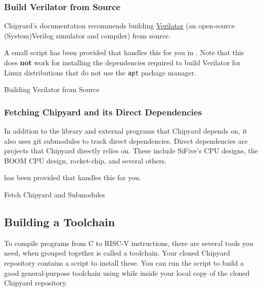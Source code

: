 \subsubsection{Build Verilator from Source}\label{sec:Build_Verilator_from_Source}
Chipyard's documentation recommends building \href{https://www.veripool.org/wiki/verilator}{Verilator} (an open-source (System)Verilog simulator and compiler) from source.

A small script has been provided that handles this for you in .
Note that this does \textbf{not} work for installing the dependencies required to build Verilator for Linux distributions that do not use the \texttt{apt} package manager.

\begin{listing}[h!tbp]
\caption{Building Verilator from Source}
\label{lst:Build_Verilator_from_Source}
\end{listing}

\subsubsection{Fetching Chipyard and its Direct Dependencies}\label{sec:Fetching_Chipyard_Direct_Dependencies}
In addition to the library and external programs that Chipyard depends on, it also uses git submodules to track direct dependencies.
Direct dependencies are projects that Chipyard directly relies on.
These include SiFive's CPU designs, the BOOM CPU design, rocket-chip, and several others.

 has been provided that handles this for you.

\begin{listing}[h!tbp]
\caption{Fetch Chipyard and Submodules}
\label{lst:Fetch_Chipyard_and_Submodules}
\end{listing}

\subsection{Building a Toolchain}\label{sec:Building_Toolchain}
To compile programs from C to RISC-V instructions, there are several tools you need, when grouped together is called a toolchain.
Your cloned Chipyard repository contains a script to install these.
You can run the script to build a good general-purpose toolchain using  while inside your local copy of the cloned Chipyard repository.

